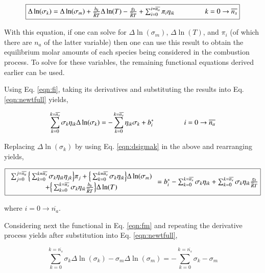 \begin{equation}
	\fbox{$
	\Delta \ln(\sigma_k) =  \Delta \ln(\sigma_m) + \frac{h_k}{\overline{R}T}\Delta \ln(T)  
	- \frac{g_k}{\overline{R}T} + \sum_{i=0}^{i=\overline{n_a}}\pi_i\eta_{ik}
	\hspace{15mm}k=0\rightarrow \overline{n_s}
	$}
\label{eqn:dsigmak}
\end{equation}

	With this equation, if one can solve for $\Delta \ln(\sigma_m)$, $\Delta \ln(T)$, and $\pi_i$
(of which there are $n_a$ of the latter variable) then one can use this result to obtain
the equilibrium molar amounts of each species being considered in the combustion process. 
To solve for these variables, the remaining functional equations derived earlier can be used.  

	Using Eq. \ref{eqn:fi}, taking its derivatives and substituting the results into
Eq. \ref{eqn:newtfull} yields,

\begin{displaymath}
	\sum_{k=0}^{k=\overline{n_s}}\sigma_k\eta_{ik}\Delta \ln(\sigma_k) = -
	\sum_{k=0}^{k=\overline{n_s}}\eta_{ik}\sigma_k + b_i^* \hspace{15mm}i=0\rightarrow \overline{n_a}
\label{eqn:one}
\end{displaymath}

	Replacing $\Delta \ln(\sigma_k)$ by using Eq. \ref{eqn:dsigmak} in the above and rearranging
yields,

\begin{equation}
	\fbox{$
	\begin{array}{c}
	\sum_{j=0}^{j=\overline{n_a}}\Big\{\sum_{k=0}^{k=\overline{n_s}}\sigma_k\eta_{ik}\eta_{jk}\Big\}\pi_j +
	\Big\{\sum_{k=0}^{k=\overline{n_s}}\sigma_k\eta_{ik}\Big\}\Delta \ln(\sigma_m) \\+ 
	\Big\{\sum_{k=0}^{k=\overline{n_s}}\sigma_k\eta_{ik}\frac{h_k}{\overline{R}T}\Big\}\Delta \ln(T) 
	\end{array}	
	= b_i^* - \sum_{k=0}^{k=\overline{n_s}}\sigma_k\eta_{ik} + \sum_{k=0}^{k=\overline{n_s}}\sigma_k
	\eta_{ik}\frac{g_k}{\overline{R}T} 
	$}
\label{eqn:final1}
\end{equation}

	where $i=0\rightarrow \overline{n_a}$.

	Considering next the functional in Eq. \ref{eqn:fm} and repeating the derivative process yields
after substitution into Eq. \ref{eqn:newtfull},

\begin{displaymath}
	\sum_{k=0}^{k=\overline{n_s}}\sigma_k \Delta \ln(\sigma_k) - \sigma_m \Delta \ln(\sigma_m) =
	- \sum_{k=0}^{k=\overline{n_s}}\sigma_k - \sigma_m	
\label{eqn:two}
\end{displaymath}

